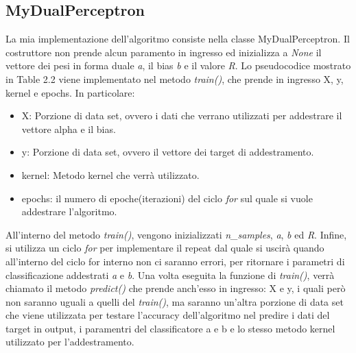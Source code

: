 \documentclass{article}
\begin{document}
    \subsection{MyDualPerceptron}
    La mia implementazione dell'algoritmo consiste nella classe MyDualPerceptron. 
	Il costruttore non prende alcun paramento in ingresso ed inizializza a \textit{None} il vettore dei pesi in forma duale \textit{a}, il bias \textit{b} 
	e il valore \textit{R}. Lo pseudocodice mostrato in Table 2.2 viene implementato nel metodo \textit{train()}, 
	che prende in ingresso X, y, kernel e epochs. In particolare:
    \begin{itemize}
    	\item X: Porzione di data set, ovvero i dati che verrano utilizzati per addestrare il vettore alpha e il bias.
    	\item y: Porzione di data set, ovvero il vettore dei target di addestramento.
    	\item kernel: Metodo kernel che verrà utilizzato.
    	\item epochs: il numero di epoche(iterazioni) del ciclo \textit{for} sul quale si vuole addestrare l'algoritmo.
    \end{itemize}
	All'interno del metodo \textit{train()}, vengono inizializzati \textit{n\_samples}, \textit{a}, \textit{b} ed \textit{R}. Infine, si utilizza un ciclo \textit{for} per implementare il repeat dal quale si uscirà quando all'interno del ciclo for interno non ci saranno errori, per ritornare i parametri di classificazione addestrati \textit{a} e \textit{b}.
    Una volta eseguita la funzione di \textit{train()}, verrà chiamato il metodo \textit{predict()} che prende anch'esso in ingresso: X e y, i quali però non saranno uguali a quelli del \textit{train()}, ma saranno un'altra porzione di data set che viene utilizzata per testare l'accuracy dell'algoritmo nel predire i dati del target in output, i paramentri del classificatore {a} e {b} e lo stesso metodo kernel utilizzato per l'addestramento.
\end{document}
